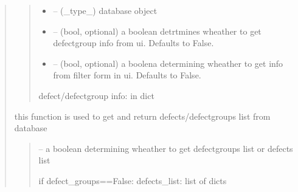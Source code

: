 \documentclass[letterpaper,10pt,english]{sphinxmanual}
\begin{document}
\begin{quote}
\begin{savenotes}
\begin{fulllineitems}
\begin{quote}
\begin{description}
\begin{itemize}
\item {} 
\sphinxAtStartPar
{} – (\_type\_) database object

\item {} 
\sphinxAtStartPar
{} – (bool, optional) a boolean detrtmines wheather to get defect\sphinxhyphen{}group info from ui. Defaults to False.

\item {} 
\sphinxAtStartPar
{} – (bool, optional) a boolena determining wheather to get info from filter form in ui. Defaults to False.

\end{itemize}

\sphinxAtStartPar
defect/defect\sphinxhyphen{}group info: in dict

\end{description}\end{quote}

\end{fulllineitems}\end{savenotes}


\begin{savenotes}\begin{fulllineitems}
\label{\detokenize{setting/backend/defect_management_funcs:oxin.backend.defect_management_funcs.get_defects_from_db}}
\pysigstartsignatures
{}
\pysigstopsignatures
\sphinxAtStartPar
this function is used to get and return defects/defect\sphinxhyphen{}groups list from database
\begin{quote}\begin{description}
\sphinxAtStartPar
{} – a boolean determining wheather to get defect\sphinxhyphen{}groups list or defects list

\sphinxAtStartPar
if defect\_groups==False:
defects\_list: list of dicts


\end{description}
\end{quote}
\end{fulllineitems}
\end{savenotes}
\end{quote}
\end{document}
